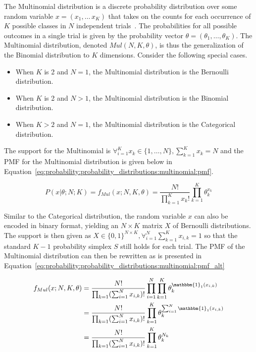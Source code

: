 The Multinomial distribution is a discrete probability distribution over some random variable $x = (x_{1}, \dots\, x_{K})$ that takes on the counts for each occurrence of $K$ possible classes in $N$ independent trials~\cite{ref:wackerly:2014}. The probabilities for all possible outcomes in a single trial is given by the probability vector $\theta = (\theta_{1}, \dots, \theta_{K})$. The Multinomial distribution, denoted $Mul(N, K, \theta)$, is thus the generalization of the Binomial distribution to $K$ dimensions. Consider the following special cases.

\begin{itemize}
      \item When $K$ is 2 and $N = 1$, the Multinomial distribution is the Bernoulli distribution.
      \item When $K$ is 2 and $N > 1$, the Multinomial distribution is the Binomial distribution.
      \item When $K > 2$ and $N = 1$, the Multinomial distribution is the Categorical distribution.
\end{itemize}

The support for the Multinomial is $\forall_{i=1}^{K} x_{k} \in \{1, \dots, N\}, \sum_{k=1}^{K}x_{k} = N$ and the \ac{PMF} for the Multinomial distribution is given below in Equation~\eqref{eq:probability:probability_distributions:multinomial:pmf}.

\begin{equation}
      \label{eq:probability:probability_distributions:multinomial:pmf}
      P(x \vert \theta; N; K) = f_{Mul}(x; N, K, \theta) = \frac{N!}{\prod_{k=1}^{K}x_{k}!} \prod_{k=1}^{K}\theta_{k}^{x_{k}}
\end{equation}

Similar to the Categorical distribution, the random variable $x$ can also be encoded in binary format, yielding an $N \times K$ matrix $X$ of Bernoulli distributions. The support is then given as $X \in \{0, 1\}^{N \times K}, \forall_{i=1}^{N}\sum_{k=1}^{K} x_{i,k} = 1$ so that the standard $K-1$ probability simplex $S$ still holds for each trial. The \ac{PMF} of the Multinomial distribution can then be rewritten as is presented in Equation~\eqref{eq:probability:probability_distributions:multinomial:pmf_alt}

\begin{equation}
      \label{eq:probability:probability_distributions:multinomial:pmf_alt}
      \begin{split}
            f_{Mul}(x; N, K, \theta) &= \frac{N!}{\prod_{k=1}(\sum_{i=1}^{N}x_{i, k})!}\prod_{i=1}^{N}\prod_{k=1}^{K}\theta_{k}^{\mathbbm{1}_{1}(x_{i,k})} \\
            &= \frac{N!}{\prod_{k=1}(\sum_{i=1}^{N}x_{i, k})!} \prod_{k=1}^{K}\theta_{k}^{\sum_{i=1}^{N}\mathbbm{1}_{1}(x_{i,k})} \\
            &= \frac{N!}{\prod_{k=1}(\sum_{i=1}^{N}x_{i, k})!} \prod_{k=1}^{K}\theta_{k}^{N_{k}} \\
      \end{split}
\end{equation}

